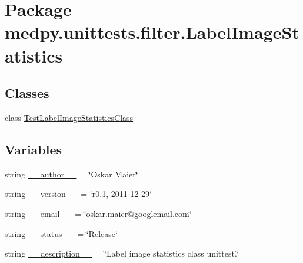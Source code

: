 \hypertarget{namespacemedpy_1_1unittests_1_1filter_1_1LabelImageStatistics}{
\section{Package medpy.unittests.filter.LabelImageStatistics}
\label{namespacemedpy_1_1unittests_1_1filter_1_1LabelImageStatistics}
}
\subsection*{Classes}
\begin{DoxyCompactItemize}
\item 
class \hyperlink{classmedpy_1_1unittests_1_1filter_1_1LabelImageStatistics_1_1TestLabelImageStatisticsClass}{TestLabelImageStatisticsClass}
\end{DoxyCompactItemize}
\subsection*{Variables}
\begin{DoxyCompactItemize}
\item 
string \hyperlink{namespacemedpy_1_1unittests_1_1filter_1_1LabelImageStatistics_a678d740a8de4263209d9d1190166d5eb}{\_\-\_\-author\_\-\_\-} = \char`\"{}Oskar Maier\char`\"{}
\item 
string \hyperlink{namespacemedpy_1_1unittests_1_1filter_1_1LabelImageStatistics_a2ad83f6bb6e9d052c0b8ecfb48a27d3b}{\_\-\_\-version\_\-\_\-} = \char`\"{}r0.1, 2011-\/12-\/29\char`\"{}
\item 
string \hyperlink{namespacemedpy_1_1unittests_1_1filter_1_1LabelImageStatistics_a46bf69d87e9dcb854475da6a7ee53399}{\_\-\_\-email\_\-\_\-} = \char`\"{}oskar.maier@googlemail.com\char`\"{}
\item 
string \hyperlink{namespacemedpy_1_1unittests_1_1filter_1_1LabelImageStatistics_a0af7c06dbb6bf6b1f5debfbdfa8dbf91}{\_\-\_\-status\_\-\_\-} = \char`\"{}Release\char`\"{}
\item 
string \hyperlink{namespacemedpy_1_1unittests_1_1filter_1_1LabelImageStatistics_a25178e0a68c8e048509a9cdc6e4b325e}{\_\-\_\-description\_\-\_\-} = \char`\"{}Label image statistics class unittest.\char`\"{}
\end{DoxyCompactItemize}


